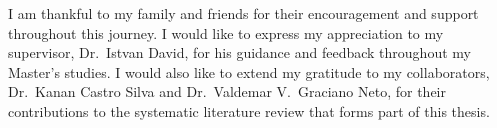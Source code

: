 I am thankful to my family and friends for their encouragement and support throughout this journey. I would like to express my appreciation to my supervisor, Dr.~Istvan David, for his guidance and feedback throughout my Master's studies. I would also like to extend my gratitude to my collaborators, Dr.~Kanan Castro Silva and Dr.~Valdemar V.~Graciano Neto, for their contributions to the systematic literature review that forms part of this thesis.